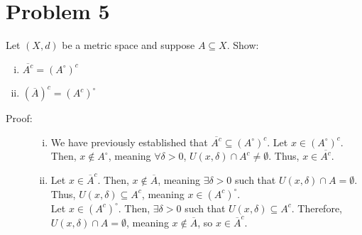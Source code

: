 \documentclass[8pt]{extarticle}
\begin{document}
  \section{Problem 5}%
  Let $(X,d)$ be a metric space and suppose $A\subseteq X$. Show:
  \begin{enumerate}[(i)]
    \item $\overline{A^c} = (A^{\circ})^{c}$
    \item $(\overline{A})^{c} = (A^{c})^{\circ}$
  \end{enumerate}
  \begin{description}
    \item[Proof:]\hfill
      \begin{enumerate}[(i)]
        \item We have previously established that $\overline{A^{c}}\subseteq (A^{\circ})^c$. Let $x\in (A^{\circ})^{c}$. Then, $x\notin A^{\circ}$, meaning $\forall \delta > 0$, $U(x,\delta)\cap A^{c} \neq \emptyset$. Thus, $x\in \overline{A^{c}}$.
        \item Let $x\in \overline{A}^{c}$. Then, $x\notin \overline{A}$, meaning $\exists \delta > 0$ such that $U(x,\delta) \cap A = \emptyset$. Thus, $U(x,\delta)\subseteq A^{c}$, meaning $x\in (A^{c})^{\circ}$.\\

          Let $x\in (A^{c})^{\circ}$. Then, $\exists \delta > 0$ such that $U(x,\delta)\subseteq A^{c}$. Therefore, $U(x,\delta)\cap A = \emptyset$, meaning $x\notin \overline{A}$, so $x\in \overline{A}^{c}$.
      \end{enumerate}
  \end{description}
\end{document}
